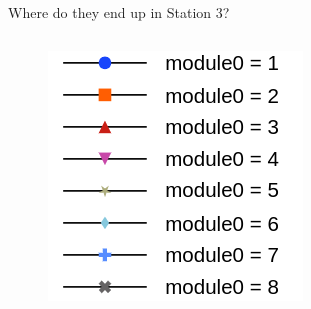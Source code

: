 \begin{frame}{Where do they end up in Station 3?}
\begin{columns}
        \begin{column}{0.2\linewidth}
            \begin{figure}
                \hspace{-7cm}\includegraphics[scale=0.25]{./assets/image.png}
            \end{figure}
        \end{column}
    \end{columns}
\end{frame}

